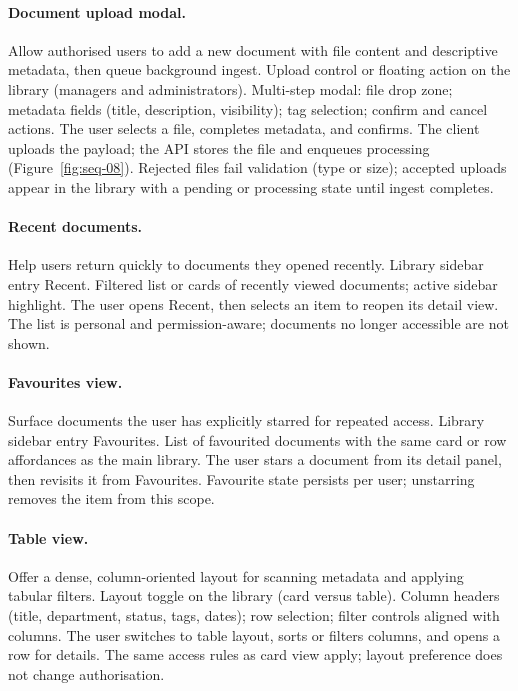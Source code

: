 \paragraph{Document upload modal.}
\uiexplain
{Allow authorised users to add a new document with file content and descriptive
metadata, then queue background ingest.}
{Upload control or floating action on the library (managers and administrators).}
{Multi-step modal: file drop zone; metadata fields (title, description,
visibility); tag selection; confirm and cancel actions.}
{The user selects a file, completes metadata, and confirms. The client uploads the
payload; the API stores the file and enqueues processing (Figure~\ref{fig:seq-08}).}
{Rejected files fail validation (type or size); accepted uploads appear in the
library with a pending or processing state until ingest completes.}

\paragraph{Recent documents.}
\uiexplain
{Help users return quickly to documents they opened recently.}
{Library sidebar entry Recent.}
{Filtered list or cards of recently viewed documents; active sidebar highlight.}
{The user opens Recent, then selects an item to reopen its detail view.}
{The list is personal and permission-aware; documents no longer accessible are
not shown.}

\paragraph{Favourites view.}
\uiexplain
{Surface documents the user has explicitly starred for repeated access.}
{Library sidebar entry Favourites.}
{List of favourited documents with the same card or row affordances as the main
library.}
{The user stars a document from its detail panel, then revisits it from
Favourites.}
{Favourite state persists per user; unstarring removes the item from this scope.}

\paragraph{Table view.}
\uiexplain
{Offer a dense, column-oriented layout for scanning metadata and applying
tabular filters.}
{Layout toggle on the library (card versus table).}
{Column headers (title, department, status, tags, dates); row selection; filter
controls aligned with columns.}
{The user switches to table layout, sorts or filters columns, and opens a row for
details.}
{The same access rules as card view apply; layout preference does not change
authorisation.}


